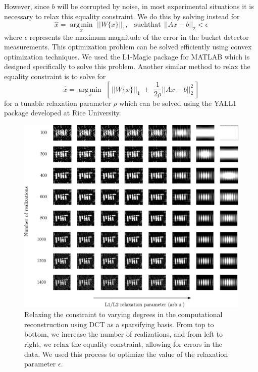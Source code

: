 However, since $b$ will be corrupted by noise, in most experimental situations it is necessary to relax this equality constraint. We do this by solving instead for
\begin{equation}
\hat{x} = \underset{x}{\operatorname{arg\,min}}\,\,||W\{x\}||_1,\,\,\, \operatorname{such that}\,||Ax - b||_2<\epsilon
\end{equation}
where $\epsilon$ represents the maximum magnitude of the error in the bucket detector measurements. This optimization problem can be solved efficiently using convex optimization techniques. We used the L1-Magic \cite{l1magic} package for MATLAB which is designed specifically to solve this problem. Another similar method to relax the equality constraint is to solve for
\begin{equation}
\hat{x} = \underset{x}{\operatorname{arg\,min}}\,\,\left[\,||W\{x\}||_1\,\,+\,\,\frac{1}{2\rho}||Ax - b||_2^2\,\right]
\end{equation}
for a tunable relaxation parameter $\rho$ which can be solved using the YALL1 package \cite{yall1} developed at Rice University.


\begin{figure}[h!]
\begin{center}
\includegraphics[width=\textwidth]{figure-ghost-compressed-tuning.pdf}
\caption{Relaxing the constraint to varying degrees in the computational reconstruction using DCT as a sparsifying basis. From top to bottom, we increase the number of realizations, and from left to right, we relax the equality constraint, allowing for errors in the data. We used this process to optimize the value of the relaxation parameter $\epsilon$.}
\label{figure:ghost-compressed-tuning}
\end{center}
\end{figure}

